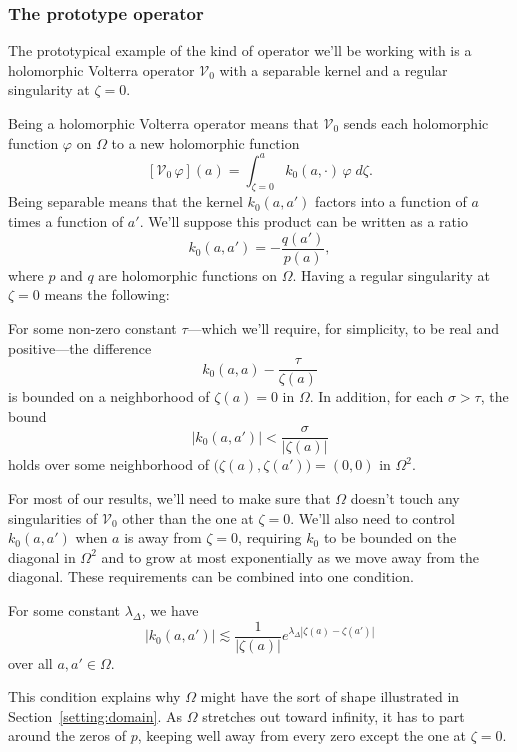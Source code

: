 \documentclass{article}
\makeatletter
\theoremstyle{definition}
\theoremstyle{plain}
\newcommand{\condconst}[2]{\item[($\text{\textsc{#1}} \mid #2$)]\protected@edef\@currentlabel{$\text{\textsc{#1}} \mid #2$}}
\newcommand{\hardpart}{\mathcal{V}_0}
\newcommand{\hardker}{k_0}
\newcommand{\domain}{\Omega}
\makeatother
\begin{document}
\subsubsection{The prototype operator}\label{setting:basic}
The prototypical example of the kind of operator we'll be working with is a holomorphic Volterra operator $\hardpart$ with a separable kernel and a regular singularity at $\zeta = 0$.

Being a holomorphic Volterra operator means that $\hardpart$ sends each holomorphic function $\varphi$ on $\domain$ to a new holomorphic function
\[ [\hardpart\,\varphi](a) = \int_{\zeta = 0}^a \hardker(a, \cdot)\,\varphi\;d\zeta. \]
Being separable means that the kernel $\hardker(a, a')$ factors into a function of $a$ times a function of $a'$. We'll suppose this product can be written as a ratio
\[ \hardker(a, a') = - \frac{q(a')}{p(a)}, \]
where $p$ and $q$ are holomorphic functions on $\domain$. Having a regular singularity at $\zeta = 0$ means the following:
\begin{conditions}
\condconst{sing}{\tau}\label{cond:sing} For some non-zero constant $\tau$---which we'll require, for simplicity, to be real and positive---the difference
\[ \hardker(a, a) - \frac{\tau}{\zeta(a)} \]
is bounded on a neighborhood of $\zeta(a) = 0$ in $\domain$.
In addition, for each $\sigma > \tau$, the bound
\[ |\hardker(a, a')| < \frac{\sigma}{|\zeta(a)|} \]
holds over some neighborhood of $\big(\zeta(a), \zeta(a')\big) = (0, 0)$ in $\domain^2$. 
\end{conditions}
For most of our results, we'll need to make sure that $\domain$ doesn't touch any singularities of $\hardpart$ other than the one at $\zeta = 0$. We'll also need to control $\hardker(a, a')$ when $a$ is away from $\zeta = 0$, requiring $\hardker$ to be bounded on the diagonal in $\domain^2$ and to grow at most exponentially as we move away from the diagonal. These requirements can be combined into one condition.
\begin{conditions}
\condconst{diag$_0$}{\lambda_\Delta}\label{cond:diag-basic} For some constant $\lambda_\Delta$, we have
\[ |\hardker(a, a')| \lesssim \frac{1}{|\zeta(a)|} e^{\lambda_\Delta|\zeta(a)-\zeta(a')|} \]
over all $a, a' \in \domain$.
\end{conditions}
This condition explains why $\domain$ might have the sort of shape illustrated in Section~\ref{setting:domain}. As $\domain$ stretches out toward infinity, it has to part around the zeros of $p$, keeping well away from every zero except the one at $\zeta = 0$. 
\end{document}
